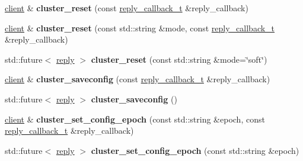 \begin{DoxyCompactItemize}
\mbox{\label{classcpp__redis_1_1client_a99c86f1931c92594f2c14ac34b3d5dfd}} 
\hyperlink{classcpp__redis_1_1client}{client} \& {\bfseries cluster\+\_\+reset} (const \hyperlink{classcpp__redis_1_1client_a061a1140d36d2eaeda82b09a0bb3f9f2}{reply\+\_\+callback\+\_\+t} \&reply\+\_\+callback)
\item 
\mbox{\label{classcpp__redis_1_1client_a3f039634232d14d4eec6fea27784a347}} 
\hyperlink{classcpp__redis_1_1client}{client} \& {\bfseries cluster\+\_\+reset} (const std\+::string \&mode, const \hyperlink{classcpp__redis_1_1client_a061a1140d36d2eaeda82b09a0bb3f9f2}{reply\+\_\+callback\+\_\+t} \&reply\+\_\+callback)
\item 
\mbox{\label{classcpp__redis_1_1client_ac49706b4ea17538653a6e5a77791ae31}} 
std\+::future$<$ \hyperlink{classcpp__redis_1_1reply}{reply} $>$ {\bfseries cluster\+\_\+reset} (const std\+::string \&mode=\char`\"{}soft\char`\"{})
\item 
\mbox{\label{classcpp__redis_1_1client_a2860dbeb1f7acd44e72e3ad02fc16e20}} 
\hyperlink{classcpp__redis_1_1client}{client} \& {\bfseries cluster\+\_\+saveconfig} (const \hyperlink{classcpp__redis_1_1client_a061a1140d36d2eaeda82b09a0bb3f9f2}{reply\+\_\+callback\+\_\+t} \&reply\+\_\+callback)
\item 
\mbox{\label{classcpp__redis_1_1client_a5b8571b48e9e56fad203a04dd50559be}} 
std\+::future$<$ \hyperlink{classcpp__redis_1_1reply}{reply} $>$ {\bfseries cluster\+\_\+saveconfig} ()
\item 
\mbox{\label{classcpp__redis_1_1client_ac930f6544459b0b2476f741beb6a2508}} 
\hyperlink{classcpp__redis_1_1client}{client} \& {\bfseries cluster\+\_\+set\+\_\+config\+\_\+epoch} (const std\+::string \&epoch, const \hyperlink{classcpp__redis_1_1client_a061a1140d36d2eaeda82b09a0bb3f9f2}{reply\+\_\+callback\+\_\+t} \&reply\+\_\+callback)
\item 
\mbox{\label{classcpp__redis_1_1client_a0be11e04ce58a13e2e40272be1fad788}} 
std\+::future$<$ \hyperlink{classcpp__redis_1_1reply}{reply} $>$ {\bfseries cluster\+\_\+set\+\_\+config\+\_\+epoch} (const std\+::string \&epoch)

\end{DoxyCompactItemize}
